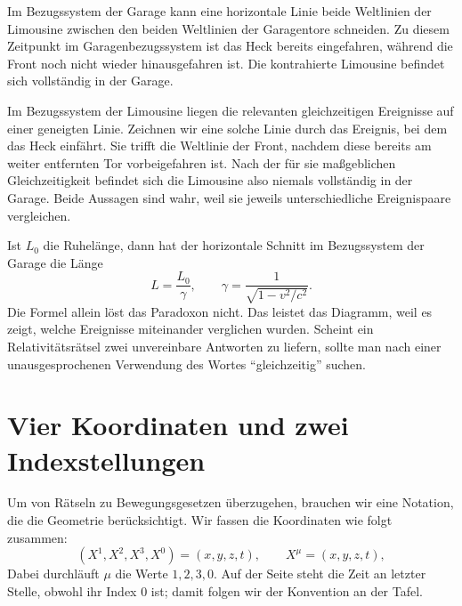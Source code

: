 Im Bezugssystem der Garage kann eine horizontale Linie beide Weltlinien der Limousine zwischen den beiden Weltlinien der Garagentore schneiden. Zu diesem Zeitpunkt im Garagenbezugssystem ist das Heck bereits eingefahren, während die Front noch nicht wieder hinausgefahren ist. Die kontrahierte Limousine befindet sich vollständig in der Garage.

Im Bezugssystem der Limousine liegen die relevanten gleichzeitigen Ereignisse auf einer geneigten Linie. Zeichnen wir eine solche Linie durch das Ereignis, bei dem das Heck einfährt. Sie trifft die Weltlinie der Front, nachdem diese bereits am weiter entfernten Tor vorbeigefahren ist. Nach der für sie maßgeblichen Gleichzeitigkeit befindet sich die Limousine also niemals vollständig in der Garage. Beide Aussagen sind wahr, weil sie jeweils unterschiedliche Ereignispaare vergleichen.

\begin{classroomqa}
\end{classroomqa}

Ist \(L_0\) die Ruhelänge, dann hat der horizontale Schnitt im Bezugssystem der Garage die Länge
\begin{equation}
L=\frac{L_0}{\gamma},
\qquad
\gamma=\frac{1}{\sqrt{1-v^2/c^2}}.
\end{equation}
Die Formel allein löst das Paradoxon nicht. Das leistet das Diagramm, weil es zeigt, welche Ereignisse miteinander verglichen wurden. Scheint ein Relativitätsrätsel zwei unvereinbare Antworten zu liefern, sollte man nach einer unausgesprochenen Verwendung des Wortes ``gleichzeitig'' suchen.

\section{Vier Koordinaten und zwei Indexstellungen}

Um von Rätseln zu Bewegungsgesetzen überzugehen, brauchen wir eine Notation, die die Geometrie berücksichtigt. Wir fassen die Koordinaten wie folgt zusammen:
\begin{equation}
(X^1,X^2,X^3,X^0)=(x,y,z,t),
\qquad X^\mu=(x,y,z,t),
\end{equation}
Dabei durchläuft \(\mu\) die Werte \(1,2,3,0\). Auf der Seite steht die Zeit an letzter Stelle, obwohl ihr Index \(0\) ist; damit folgen wir der Konvention an der Tafel.


